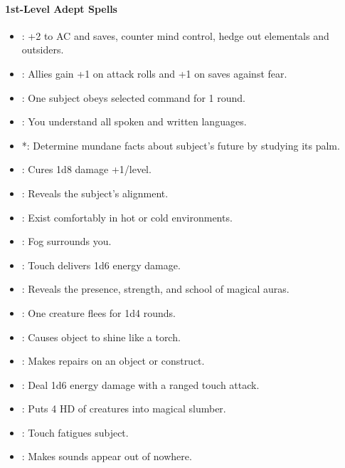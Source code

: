 \paragraph{1st-Level Adept Spells}
\begin{itemize}
\item {}: +2 to AC and saves, counter mind control, hedge out elementals and outsiders.
\item {}: Allies gain +1 on attack rolls and +1 on saves against fear.
\item {}: One subject obeys selected command for 1 round.
\item {}: You understand all spoken and written languages.
\item {}*: Determine mundane facts about subject's future by studying its palm.
\item {}: Cures 1d8 damage +1/level.
\item {}: Reveals the subject's alignment.
\item {}: Exist comfortably in hot or cold environments.
\item {}: Fog surrounds you.
\item {}: Touch delivers 1d6 energy damage.
\item {}: Reveals the presence, strength, and school of magical auras.
\item {}: One creature flees for 1d4 rounds.
\item {}: Causes object to shine like a torch.
\item {}: Makes repairs on an object or construct.
\item {}: Deal 1d6 energy damage with a ranged touch attack.
\item {}: Puts 4 HD of creatures into magical slumber.
\item {}: Touch fatigues subject.
\item {}: Makes sounds appear out of nowhere.
\end{itemize}
